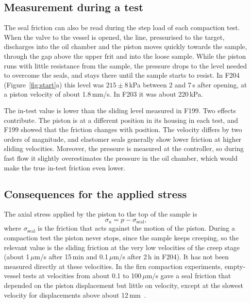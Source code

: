 \subsection{Measurement during a test}

The seal friction can also be read during the step load of each compaction test. When the valve to the vessel is opened, the line, pressurised to the target, discharges into the oil chamber and the piston moves quickly towards the sample, through the gap above the upper frit and into the loose sample. While the piston runs with little resistance from the sample, the pressure drops to the level needed to overcome the seals, and stays there until the sample starts to resist. In F204 (Figure~\ref{fig:start}a) this level was $215\pm8$\,kPa between 2 and 7\,s after opening, at a piston velocity of about 1.8\,mm/s. In F203 it was about 220\,kPa.

The in-test value is lower than the sliding level measured in F199. Two effects contribute. The piston is at a different position in its housing in each test, and F199 showed that the friction changes with position. The velocity differs by two orders of magnitude, and elastomer seals generally show lower friction at higher sliding velocities. Moreover, the pressure is measured at the controller, so during fast flow it slightly overestimates the pressure in the oil chamber, which would make the true in-test friction even lower.

\subsection{Consequences for the applied stress}

The axial stress applied by the piston to the top of the sample is
\begin{equation}
    \sigma_a = p - \sigma_{\mathrm{seal}},
    \label{eq:sigma_a}
\end{equation}
where $\sigma_{\mathrm{seal}}$ is the friction that acts against the motion of the piston. During a compaction test the piston never stops, since the sample keeps creeping, so the relevant value is the sliding friction at the very low velocities of the creep stage (about 1\,$\mu$m/s after 15\,min and 0.1\,$\mu$m/s after 2\,h in F204). It has not been measured directly at these velocities.
In the firn compaction experiments, empty-vessel tests at velocities from about 0.1 to 100\,$\mu$m/s gave a seal friction that depended on the piston displacement but little on velocity, except at the slowest velocity for displacements above about 12\,mm~\cite{firn_inprep}.

